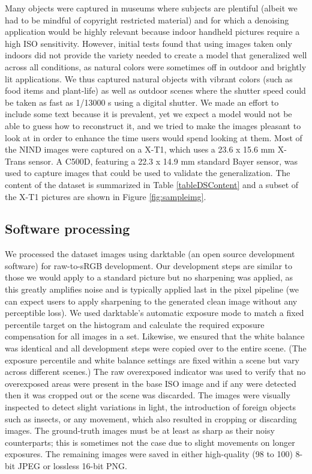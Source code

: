 Many objects were captured in museums where subjects are plentiful (albeit we had to be mindful of copyright restricted material) and for which a denoising application would be highly relevant because indoor handheld pictures require a high ISO sensitivity. However, initial tests found that using images taken only indoors did not provide the variety needed to create a model that generalized well across all conditions, as natural colors were sometimes off in outdoor and brightly lit applications. We thus captured natural objects with vibrant colors (such as food items and plant-life) as well as outdoor scenes where the shutter speed could be taken as fast as 1/13000 s using a digital shutter. We made an effort to include some text because it is prevalent, yet we expect a model would not be able to guess how to reconstruct it, and we tried to make the images pleasant to look at in order to enhance the time users would spend looking at them. Most of the NIND images were captured on a \acl{X-T1}, which uses a 23.6 x 15.6 mm X-Trans sensor. A \ac{C500D}, featuring a 22.3 x 14.9 mm standard Bayer sensor, was used to capture images that could be used to validate the generalization. The content of the dataset is summarized in Table \ref{tableDSContent} and a subset of the \acs{X-T1} pictures are shown in Figure \ref{fig:sampleimg}.
\subsection{Software processing}
We processed the dataset images using darktable \cite{darktable} (an open source development software) for raw-to-sRGB development. Our development steps are similar to those we would apply to a standard picture but no sharpening was applied, as this greatly amplifies noise and is typically applied last in the pixel pipeline (we can expect users to apply sharpening to the generated clean image without any perceptible loss). We used darktable's automatic exposure mode to match a fixed percentile target on the histogram and calculate the required exposure compensation for all images in a set. Likewise, we ensured that the white balance was identical and all development steps were copied over to the entire scene. (The exposure percentile and white balance settings are fixed within a scene but vary across different scenes.) The raw overexposed indicator was used to verify that no overexposed areas were present in the base ISO image and if any were detected then it was cropped out or the scene was discarded. The images were visually inspected to detect slight variations in light, the introduction of foreign objects such as insects, or any movement, which also resulted in cropping or discarding images. The ground-truth images must be at least as sharp as their noisy counterparts; this is sometimes not the case due to slight movements on longer exposures. The remaining images were saved in either high-quality (98 to 100) 8-bit JPEG or lossless 16-bit PNG.


